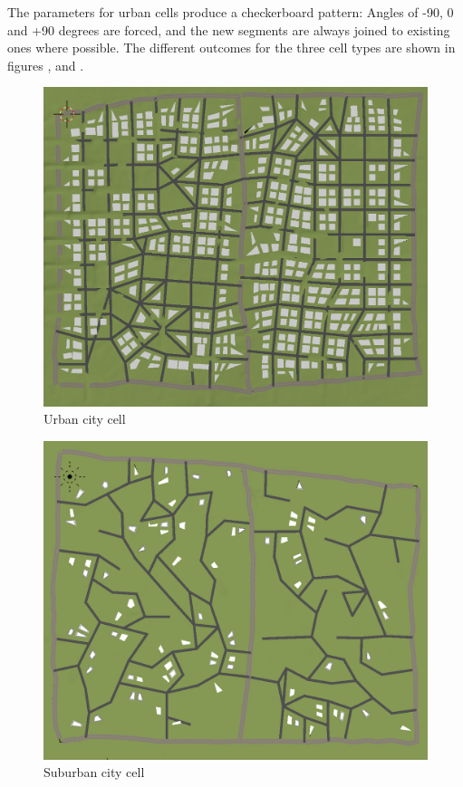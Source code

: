 \documentclass[a4paper,12pt]{scrartcl}
\begin{document}
The parameters for urban cells produce a checkerboard pattern: Angles of -90, 0 and +90 degrees are forced, and the new segments are always joined to existing ones where possible. The different outcomes for the three cell types are shown in figures ,  and .

\begin{figure}[h]
\center
\includegraphics[width=\textwidth]{cellU.png}
\caption{Urban city cell}
\label{fig:cellU}
\end{figure}

\begin{figure}[h]
\center
\includegraphics[width=\textwidth]{cellS.png}
\caption{Suburban city cell}
\label{fig:cellS}
\end{figure}
\end{document}
